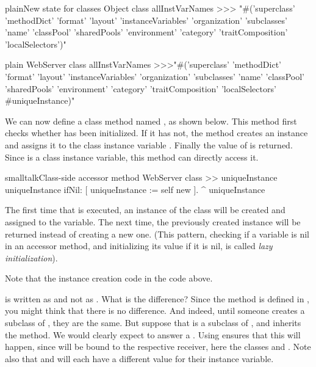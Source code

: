 \documentclass[10pt,twoside,english]{_support/latex/sbabook/sbabook}
\begin{document}
\begin{listing}[float, label=scr:instance]{plain}{New state for classes}
Object class allInstVarNames
>>>  "#('superclass' 'methodDict' 'format' 'layout' 'instanceVariables' 'organization' 'subclasses' 'name' 'classPool' 'sharedPools' 'environment' 'category' 'traitComposition' 'localSelectors')"
\end{listing}

\begin{displaycode}{plain}
WebServer class allInstVarNames
>>>"#('superclass' 'methodDict' 'format' 'layout' 'instanceVariables' 'organization' 'subclasses' 'name' 'classPool' 'sharedPools' 'environment' 'category' 'traitComposition' 'localSelectors' #uniqueInstance)"
\end{displaycode}

We can now define a class method named , as shown below. This
method first checks whether  has been initialized. If it has
not, the method creates an instance and assigns it to the class instance
variable . Finally the value of  is
returned. Since  is a class instance variable, this method can
directly access it.

\begin{listing}[float, label=scr:uniqueInstance]{smalltalk}{Class-side accessor method }
WebServer class >> uniqueInstance
     uniqueInstance ifNil: [ uniqueInstance := self new ].
     ^ uniqueInstance
\end{listing}

The first time that  is executed, an instance of the
class  will be created and assigned to the 
variable. The next time, the previously created instance will be returned
instead of creating a new one. (This pattern, checking if a variable is nil
in an accessor method, and initializing its value if it is nil, is called
\textit{lazy initialization}).

Note that the instance creation code in the code above.

is written as  and not as . What is the difference?
Since the  method is defined in , you might
think that there is no difference. And indeed, until someone creates a subclass
of , they are the same. But suppose that  is
a subclass of , and inherits the  method. We
would clearly expect  to answer a
. Using  ensures that this will happen, since
 will be bound to the respective receiver, here the classes
 and . Note also that  and
 will each have a different value for their
 instance variable.
\end{document}

